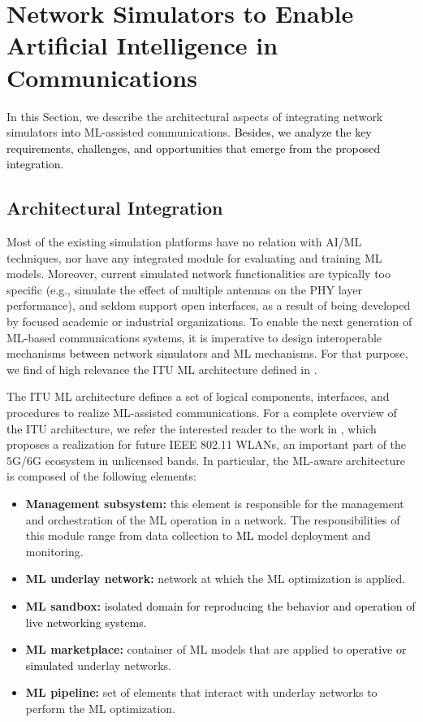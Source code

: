 \documentclass[journal]{IEEEtran}
\begin{document}
	\section{Network Simulators to Enable Artificial Intelligence in Communications}	
	In this Section, we describe the architectural aspects of integrating network simulators \textcolor{black}{into} ML-assisted communications. \textcolor{black}{Besides, we analyze the key requirements, challenges, and opportunities that emerge from the proposed integration.}
	
	\subsection{Architectural Integration}
	Most of the existing simulation platforms have no relation with AI/ML techniques, nor have any integrated module for evaluating and training ML models. Moreover, current simulated network functionalities are typically too specific (e.g., simulate the effect of multiple antennas on the PHY layer performance), and seldom support open interfaces, as a result of being developed by focused academic or industrial organizations. To enable the next generation of ML-based communications systems, it is imperative to design interoperable mechanisms \textcolor{black}{between} network simulators and ML mechanisms. For that purpose, we find of high relevance the ITU ML architecture defined in \cite{ITU3172}.	
	
    The ITU ML architecture defines a set of logical components, interfaces, and procedures to realize ML-assisted communications. For a complete overview of \textcolor{black}{the} ITU architecture, we refer the interested reader to the work in \cite{itu_architecture}, which proposes a realization for future IEEE 802.11 WLANs, an important part of the 5G/6G ecosystem in unlicensed bands. In particular, the ML-aware architecture is composed of the following elements:
	\begin{itemize}
		\item \textbf{Management subsystem:} this element is responsible for the management and orchestration of the ML operation in a network. The responsibilities of this module range from data collection to \textcolor{black}{ML} model deployment and monitoring.
		\item \textbf{ML underlay network:} network at which the ML optimization is applied.
		\item \textbf{ML sandbox:} \textcolor{black}{isolated domain for reproducing the behavior and operation of live networking systems.}		
		\item \textbf{ML marketplace:} container of ML models that are applied to \textcolor{black}{operative or simulated} underlay networks.
		\item \textbf{ML pipeline:} set of elements that interact with underlay networks to perform the ML optimization. 
	\end{itemize} 
	
\end{document}
